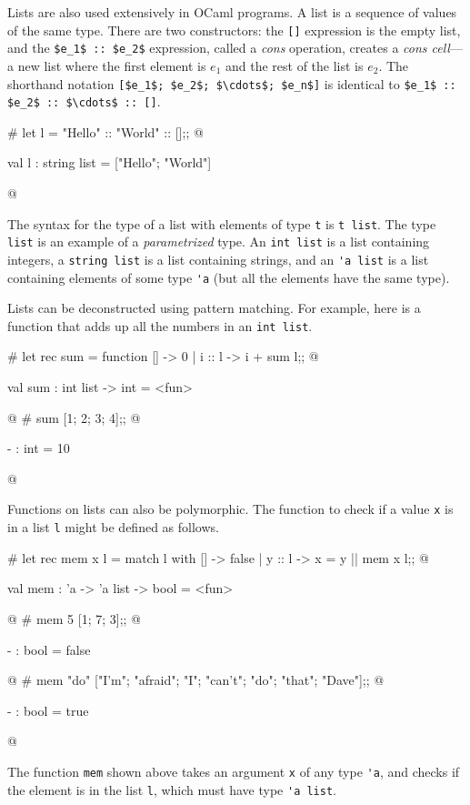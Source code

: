 Lists are also used extensively in OCaml programs.  A list is a
sequence of values of the same type.  There are two constructors: the
\hbox{\hbox{\lstinline/[]/}} expression is the empty list, and the \hbox{\lstinline/$e_1$ :: $e_2$/}
expression, called a \emph{cons} operation, creates a \emph{cons
cell}---a new list where the first element is $e_1$ and the rest of
the list is $e_2$.  The shorthand notation
\hbox{\hbox{\lstinline/[$e_1$; $e_2$; $\cdots$; $e_n$]/}}
is identical to \hbox{\hbox{\lstinline/$e_1$ :: $e_2$ :: $\cdots$ :: []/}}.

\begin{ocaml}
# let l = "Hello" :: "World" :: [];;
@
\begin{topoutput}
val l : string list = ["Hello"; "World"]
\end{topoutput}
@
\end{ocaml}
%
The syntax for the type of a list with elements of type \hbox{\hbox{\lstinline/t/}} is \hbox{\lstinline/t list/}.
The type \hbox{\hbox{\lstinline/list/}} is an example of a \emph{parametrized} type.  An
\hbox{\hbox{\lstinline/int list/}} is a list containing integers, a \hbox{\lstinline/string list/} is
a list containing strings, and an \hbox{\hbox{\lstinline/'a list/}} is a list containing
elements of some type \hbox{\hbox{\lstinline/'a/}} (but all the elements have the
same type).

\label{patterns:lists}
Lists can be deconstructed using pattern matching.  For example, here is
a function that adds up all the numbers in an \hbox{\hbox{\lstinline/int list/}}.

\begin{ocaml}
# let rec sum = function
     [] -> 0
   | i :: l -> i + sum l;;
@
\begin{topoutput}
val sum : int list -> int = <fun>
\end{topoutput}
@
# sum [1; 2; 3; 4];;
@
\begin{topoutput}
- : int = 10
\end{topoutput}
@
\end{ocaml}
%
Functions on lists can also be polymorphic.  The function to check if a
value \hbox{\hbox{\lstinline/x/}} is in a list \hbox{\lstinline/l/} might be defined as follows.

\begin{ocaml}
# let rec mem x l =
     match l with
        [] -> false
      | y :: l -> x = y || mem x l;;
@
\begin{topoutput}
val mem : 'a -> 'a list -> bool = <fun>
\end{topoutput}
@
# mem 5 [1; 7; 3];;
@
\begin{topoutput}
- : bool = false
\end{topoutput}
@
# mem "do" ["I'm"; "afraid"; "I"; "can't"; "do"; "that"; "Dave"];;
@
\begin{topoutput}
- : bool = true
\end{topoutput}
@
\end{ocaml}
%
The function \hbox{\hbox{\lstinline/mem/}} shown above takes an
argument \hbox{\hbox{\lstinline/x/}} of any type \hbox{\lstinline/'a/}, and
checks if the element is in the list \hbox{\hbox{\lstinline/l/}}, which must
have type \hbox{\hbox{\lstinline/'a list/}}.

